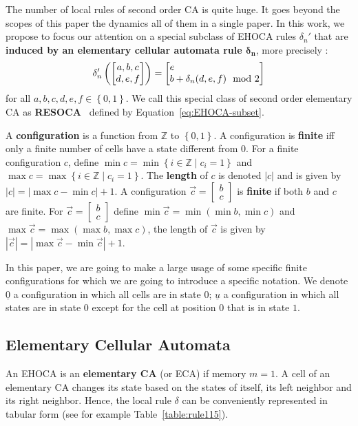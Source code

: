 \documentclass[submission,copyright,creativecommons]{eptcs}
\newcommand{\zo}{\set{0,1}}
\newcommand{\set}[1]{\ensuremath{\left\{#1\right\}}\xspace}
\newcommand{\Z}{\ensuremath{\mathbb{Z}}\xspace}
\newcommand{\ZO}{\ensuremath{\set{0,1}}\xspace}
\newcommand{\cvres}[2]{\ensuremath{\begin{bmatrix}#1\\#2\end{bmatrix}}\xspace}
\newcommand{\cz}{\ensuremath{\underline{0}}\xspace}
\newcommand{\cu}{\ensuremath{\underline{u}}\xspace}
\newcommand{\RESOCA}{RESOCA\xspace}
\begin{document}
The number of local rules of second order CA is quite huge. It goes beyond the scopes of this paper the dynamics all of them
in a single paper. In this work, we propose to focus our attention on a special subclass of EHOCA rules $\delta_n'$
that are \textbf{induced by an elementary cellular automata rule $\boldsymbol\delta_{\boldsymbol n}$},
more precisely :
\begin{equation}
\label{eq:EHOCA-subset}
\delta'_n\left(
\begin{bmatrix}
    a,b,c\\
    d,e,f
\end{bmatrix}
\right)=
\begin{bmatrix}
    e\hfill\\
b+\delta_n(d,e,f)\mod 2
\end{bmatrix}
\end{equation}
for all $a,b,c,d,e,f\in\zo$.
We call this special class of second order elementary CA as \textbf{\RESOCA}~\cite{formenti2024elementary} defined by Equation~\eqref{eq:EHOCA-subset}.

A \textbf{configuration} is a function from \Z to \ZO. A configuration is \textbf{finite} iff only a finite number of cells have a state different from $0$. For a finite configuration $c$, define $\min c=\min\set{i\in\Z\;|\;c_i=1}$
and $\max c=\max\set{i\in\Z\;|\;c_i=1}$. The
\textbf{length} of $c$ is denoted $|c|$ and is
given by $|c|=|\max c-\min c|+1$.
A configuration $\vec c=\cvres{b}{c}$ is \textbf{finite} if both $b$ and $c$ are finite.
For $\vec c=\cvres{b}{c}$ define $\min\vec c=\min(\min b,\min c)$ and $\max\vec c=\max(\max b,\max c)$, the length of $\vec c$
is given by
$|\vec c|=|\max\vec c-\min\vec c|+1$.

In this paper, we are going to make a large usage of some specific finite configurations for which we are going to introduce a specific notation. We denote \cz a configuration in which all cells are in state $0$; \cu a configuration in which all states are in state $0$ except for the cell at position $0$ that is in state $1$.

\subsection{Elementary Cellular Automata}
\label{sec:ECA}
%
An EHOCA is an \textbf{elementary CA} (or ECA) if memory $m=1$. A cell of an elementary CA changes its state based on the states of itself, its left neighbor and its right neighbor. Hence,
the local rule $\delta$ can be conveniently represented in tabular form (see for example Table~\ref{table:rule115}). 
\end{document}
